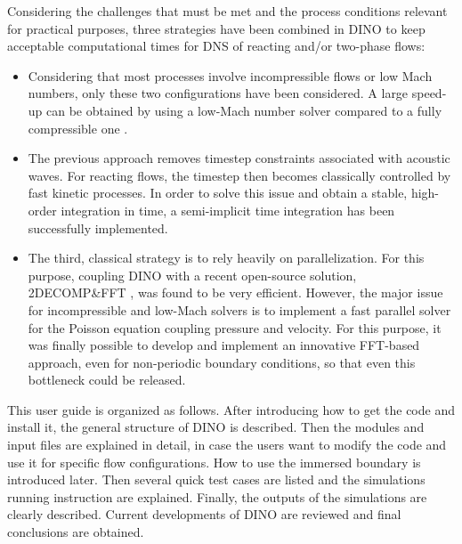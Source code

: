 Considering the challenges that must be met and the process conditions relevant for practical purposes, three strategies have been combined in DINO to keep acceptable computational times for DNS of reacting and/or two-phase flows:
\begin{itemize}
\item Considering that most processes involve incompressible flows or low Mach numbers, only these two configurations have been considered. A large speed-up can be obtained by using a low-Mach number solver compared to a fully compressible one \cite{julian2002}.
\item The previous approach removes timestep constraints associated with acoustic waves. For reacting flows, the timestep then becomes classically controlled by fast kinetic processes. In order to solve this issue and obtain a stable, high-order integration in time, a semi-implicit time integration has been successfully implemented.
\item The third, classical strategy is to rely heavily on parallelization. For this purpose, coupling DINO with a recent open-source solution, 2DECOMP\&FFT \cite{2decomp_fft}, was found to be very efficient. However, the major issue for incompressible and low-Mach solvers is to implement a fast parallel solver for the Poisson equation coupling pressure and velocity. For this purpose, it was finally possible to develop and implement an innovative FFT-based approach, even for non-periodic boundary conditions, so that even this bottleneck could be released.

\end{itemize}

This user guide is organized as follows. After introducing how to get the code and install it, the general structure of DINO is described. Then the modules and input files are explained in detail, in case the users want to modify the code and use it for specific flow configurations. How to use the immersed boundary is introduced later. Then several quick test cases are listed and the simulations running instruction are explained. Finally, the outputs of the simulations are clearly described. Current developments of DINO are reviewed and final conclusions are obtained.
